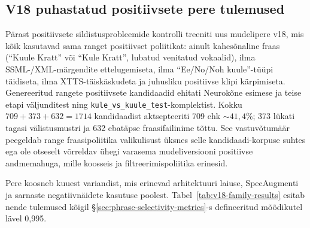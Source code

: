 \subsection{V18 puhastatud positiivsete pere tulemused}
\label{sec:v18-results}

Pärast positiivsete sildistusprobleemide kontrolli treeniti uus mudelipere v18, mis kõik kasutavad sama ranget positiivset poliitikat: ainult kahesõnaline fraas (\enquote{Kuule Kratt} või \enquote{Kule Kratt}, lubatud venitatud vokaalid), ilma SSML-/XML-märgendite ettelugemiseta, ilma \enquote{Ee/No/Noh kuule}-tüüpi täidiseta, ilma XTTS-täiskäskudeta ja juhusliku positiivse klipi kärpimiseta. Genereeritud rangete positiivsete kandidaadid ehitati Neurokõne esimese ja teise etapi väljunditest ning \texttt{kule\_vs\_kuule\_test}-komplektist. Kokku $709 + 373 + 632 = 1714$ kandidaadist aktsepteeriti 709 ehk ${\sim}41{,}4$\%; 373 lükati tagasi välistusmustri ja 632 ebatäpse fraasifailinime tõttu. See vastuvõtumäär peegeldab range fraasipoliitika valikulisust üksnes selle kandidaadi-korpuse suhtes ega ole otseselt võrreldav ühegi varasema mudeliversiooni positiivse andmemahuga, mille koosseis ja filtreerimispoliitika erinesid.

Pere koosneb kuuest variandist, mis erinevad arhitektuuri laiuse, SpecAugmenti ja sarnaste negatiivnäidete kasutuse poolest. Tabel~\ref{tab:v18-family-results} esitab nende tulemused kõigil §\ref{sec:phrase-selectivity-metrics}-s defineeritud mõõdikutel lävel 0,995.

